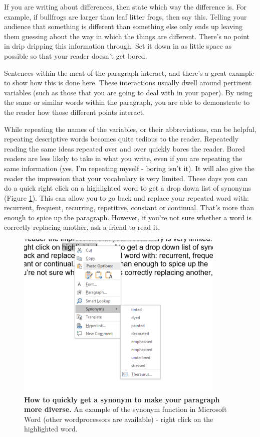 \documentclass[
]{krantz}
\begin{document}
If you are writing about differences, then state which way the difference is. For example, if bullfrogs are larger than leaf litter frogs, then say this. Telling your audience that something is different than something else only ends up leaving them guessing about the way in which the things are different. There's no point in drip dripping this information through. Set it down in as little space as possible so that your reader doesn't get bored.

Sentences within the meat of the paragraph interact, and there's a great example to show how this is done here. These interactions usually dwell around pertinent variables (such as those that you are going to deal with in your paper). By using the same or similar words within the paragraph, you are able to demonstrate to the reader how those different points interact.

While repeating the names of the variables, or their abbreviations, can be helpful, repeating descriptive words becomes quite tedious to the reader. Repeatedly reading the same ideas repeated over and over quickly bores the reader. Bored readers are less likely to take in what you write, even if you are repeating the same information (yes, I'm repeating myself - boring isn't it). It will also give the reader the impression that your vocabulary is very limited. These days you can do a quick right click on a highlighted word to get a drop down list of synonyms (Figure \ref{fig:synonym}). This can allow you to go back and replace your repeated word with: recurrent, frequent, recurring, repetitive, constant or continual. That's more than enough to spice up the paragraph. However, if you're not sure whether a word is correctly replacing another, ask a friend to read it.



\begin{figure}

\includegraphics[width=0.5\linewidth]{figures/synonym} \hfill{}

\caption{\textbf{How to quickly get a synonym to make your paragraph more diverse.} An example of the synonym function in Microsoft Word (other wordprocessors are available) - right click on the highlighted word.}\label{fig:synonym}
\end{figure}
\end{document}
